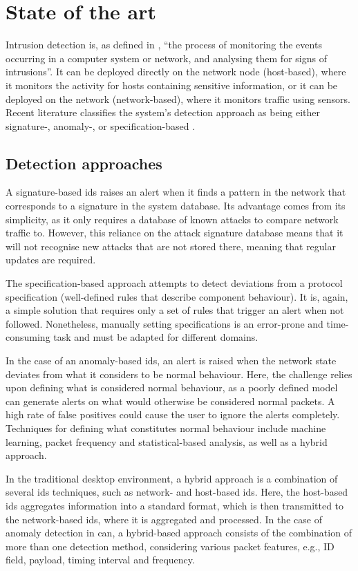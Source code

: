 \chapter{State of the art}
\label{c:sota}

Intrusion detection is, as defined in \cite{Liao2013}, “the process of monitoring the events occurring in a computer system or network, and analysing them for signs of intrusions”. It can be deployed directly on the network node (host-based), where it monitors the activity for hosts containing sensitive information, or it can be deployed on the network (network-based), where it monitors traffic using sensors. Recent literature classifies the system’s detection approach as being either signature-, anomaly-, or specification-based \citep{Lokman2019}.

\section{Detection approaches}
\label{sec:ids_detection_approaches}

A signature-based \gls{ids} raises an alert when it finds a pattern in the network that corresponds to a signature in the system database. Its advantage comes from its simplicity, as it only requires a database of known attacks to compare network traffic to. However, this reliance on the attack signature database means that it will not recognise new attacks that are not stored there, meaning that regular updates are required.\par
The specification-based approach attempts to detect deviations from a protocol specification (well-defined rules that describe component behaviour). It is, again, a simple solution that requires only a set of rules that trigger an alert when not followed. Nonetheless, manually setting specifications is an error-prone and time-consuming task and must be adapted for different domains.\par
In the case of an anomaly-based \gls{ids}, an alert is raised when the network state deviates from what it considers to be normal behaviour. Here, the challenge relies upon defining what is considered normal behaviour, as a poorly defined model can generate alerts on what would otherwise be considered normal packets. A high rate of false positives could cause the user to ignore the alerts completely. Techniques for defining what constitutes normal behaviour include machine learning, packet frequency and statistical-based analysis, as well as a hybrid approach.\par
In the traditional desktop environment, a hybrid approach is a combination of several \gls{ids} techniques, such as network- and host-based \gls{ids}. Here, the host-based \gls{ids} aggregates information into a standard format, which is then transmitted to the network-based \gls{ids}, where it is aggregated and processed. In the case of anomaly detection in \gls{can}, a hybrid-based approach consists of the combination of more than one detection method, considering various packet features, e.g., ID field, payload, timing interval and frequency.

